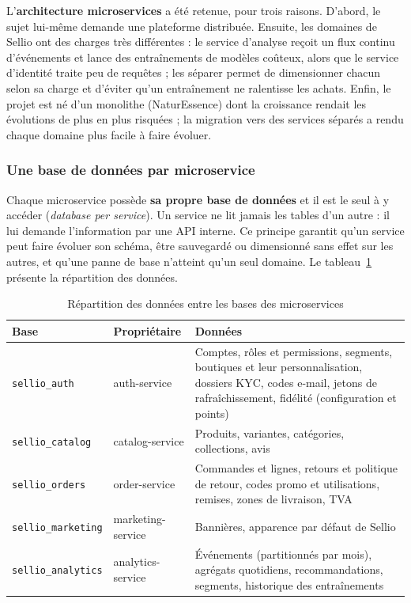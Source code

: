 L'\textbf{architecture microservices} a été retenue, pour trois raisons. D'abord, le sujet lui-même demande une plateforme distribuée. Ensuite, les domaines de Sellio ont des charges très différentes : le service d'analyse reçoit un flux continu d'événements et lance des entraînements de modèles coûteux, alors que le service d'identité traite peu de requêtes ; les séparer permet de dimensionner chacun selon sa charge et d'éviter qu'un entraînement ne ralentisse les achats. Enfin, le projet est né d'un monolithe (NaturEssence) dont la croissance rendait les évolutions de plus en plus risquées ; la migration vers des services séparés a rendu chaque domaine plus facile à faire évoluer.


\subsubsection{Une base de données par microservice}
Chaque microservice possède \textbf{sa propre base de données} et il est le seul à y accéder (\textit{database per service}). Un service ne lit jamais les tables d'un autre : il lui demande l'information par une API interne. Ce principe garantit qu'un service peut faire évoluer son schéma, être sauvegardé ou dimensionné sans effet sur les autres, et qu'une panne de base n'atteint qu'un seul domaine. Le tableau~\ref{tab:bases} présente la répartition des données.
\begin{table}[H]
\centering
\renewcommand{\arraystretch}{1.3}
\small
\begin{tabular}{|p{3.1cm}|p{2.3cm}|p{9.2cm}|}
\hline
\textbf{Base} & \textbf{Propriétaire} & \textbf{Données} \\
\hline
\texttt{sellio\_auth} & auth-service & Comptes, rôles et permissions, segments, boutiques et leur personnalisation, dossiers KYC, codes e-mail, jetons de rafraîchissement, fidélité (configuration et points) \\
\hline
\texttt{sellio\_catalog} & catalog-service & Produits, variantes, catégories, collections, avis \\
\hline
\texttt{sellio\_orders} & order-service & Commandes et lignes, retours et politique de retour, codes promo et utilisations, remises, zones de livraison, TVA \\
\hline
\texttt{sellio\_marketing} & marketing-service & Bannières, apparence par défaut de Sellio \\
\hline
\texttt{sellio\_analytics} & analytics-service & Événements (partitionnés par mois), agrégats quotidiens, recommandations, segments, historique des entraînements \\
\hline
\end{tabular}
\caption{Répartition des données entre les bases des microservices}
\label{tab:bases}
\end{table}


